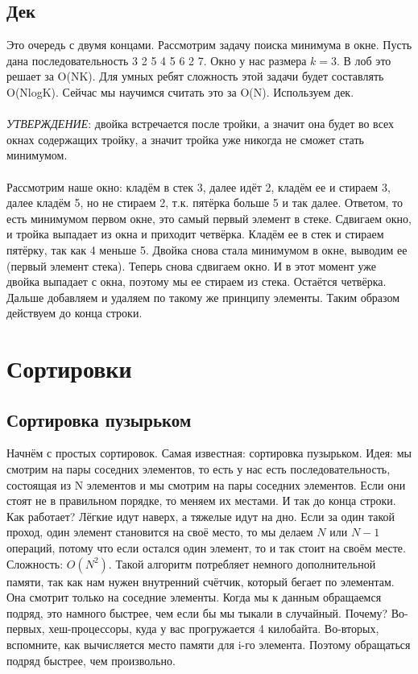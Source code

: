 \documentclass[a4paper,12pt]{article}
\begin{document}
\subsection{Дек}
Это очередь с двумя концами. Рассмотрим задачу поиска минимума в окне. Пусть дана последовательность 3 2 5 4 5 6 2 7. Окно у нас размера $k = 3$. В лоб это решает за O(NK). Для умных ребят сложность этой задачи будет составлять O(NlogK). Сейчас мы научимся считать это за O(N). Используем дек. \\
\\
\textit{УТВЕРЖДЕНИЕ}: двойка встречается после тройки, а значит она будет во всех окнах содержащих тройку, а значит тройка уже никогда не сможет стать минимумом. \\
\\
Рассмотрим наше окно: кладём в стек 3, далее идёт 2, кладём ее и стираем 3, далее кладём 5, но не стираем 2, т.к. пятёрка больше 5 и так далее. Ответом, то есть минимумом первом окне, это самый первый элемент в стеке. Сдвигаем окно, и тройка выпадает из окна и приходит четвёрка. Кладём ее в стек и стираем пятёрку, так как 4 меньше 5. Двойка снова стала минимумом в окне, выводим ее (первый элемент стека). Теперь снова сдвигаем окно. И в этот момент уже двойка выпадает с окна, поэтому мы ее стираем из стека. Остаётся четвёрка. Дальше добавляем и удаляем по такому же принципу элементы. Таким образом действуем до конца строки.
\newpage
\section{Сортировки}
\subsection{Сортировка пузырьком}
Начнём с простых сортировок. Самая известная: сортировка пузырьком. Идея: мы смотрим на пары соседних элементов, то есть у нас есть последовательность, состоящая из N элементов и мы смотрим на пары соседних элементов. Если они стоят не в правильном порядке, то меняем их местами. И так до конца строки. Как работает? Лёгкие идут наверх, а тяжелые идут на дно. Если за один такой проход, один элемент становится на своё место, то мы делаем $N$ или $N - 1$ операций, потому что если остался один элемент, то и так стоит на своём месте. Сложность: $O(N^2)$. Такой алгоритм потребляет немного дополнительной памяти, так как нам нужен внутренний счётчик, который бегает по элементам. Она смотрит только на соседние элементы. Когда мы к данным обращаемся подряд, это намного быстрее, чем если бы мы тыкали в случайный. Почему? Во-первых, хеш-процессоры, куда у вас прогружается 4 килобайта. Во-вторых, вспомните, как вычисляется место памяти для i-го элемента. Поэтому обращаться подряд быстрее, чем произвольно.
\end{document}

